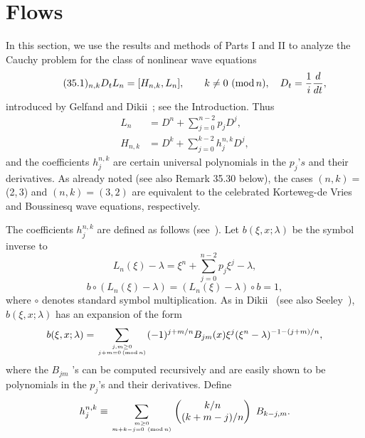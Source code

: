 \documentclass{surv-l}
\theoremstyle{plain}
\theoremstyle{definition}
\numberwithin{equation}{chapter}
\begin{document}
\section{Flows}\label{sec35}
In this section, we use the results and methods of Parts I and II to analyze the Cauchy problem for the class of nonlinear wave equations
\begin{equation*}
\tag*{$(35.1)_{n,k}$} D_{t}L_{n}=[H_{n,k}, L_{n}],\qquad k\neq 0\ (\mathrm{mod}\, n),\quad D_{t}=\displaystyle \frac{1}{i}\frac{d}{dt},
\end{equation*}
introduced by Gelfand and Dikii~\cite{GD}; see the Introduction. Thus
\begin{align*}
L_{n}&=D^{n}+\sum_{j=0}^{n-2}p_{j}D^{j},\\
H_{n,k}&=D^{k}+\sum_{j=0}^{k-2}h_{j}^{n,k}D^{j},
\end{align*}
and the coefficients $h_{j}^{n,k}$ are certain universal polynomials in the $p_{j}$'$s$ and their derivatives. As already noted (see also Remark 35.30 below), the cases $(n, k)=$ (2,\,3) and $(n,k)=(3, 2)$ are equivalent to the celebrated Korteweg-de Vries and Boussinesq wave equations, respectively.

The coefficients $h_{j}^{n,k}$ are defined as follows (see~\cite{GD}). Let $b(\xi, x; \lambda)$ be the symbol inverse to
\begin{equation*}
L_{n}(\xi)-\lambda=\xi^{n}+\sum_{j=0}^{n-2}p_{j}\xi^{j}-\lambda,
\end{equation*}
\begin{equation*}
b\circ(L_{n}(\xi)-\lambda)=(L_{n}(\xi)-\lambda)\circ b=1,
\end{equation*}
where $\circ$ denotes standard symbol multiplication. As in Dikii~\cite{Di} (see also Seeley~\cite{Se}), $b(\xi, x;\lambda)$ has an expansion of the form
\begin{equation*}
b(\xi, x; \lambda)=\sum_{j,m\geq 0\atop j+m=0\,(\mathrm{mod}\,n)}(-1)^{j+m/n}B_{jm}(x)\xi^{j}(\xi^{n}-\lambda)^{-1-(j+m)/n},
\end{equation*}
where the $B_{jm}$ 's can be computed recursively and are easily shown to be polynomials in the $p_{j}$'s and their derivatives. Define
\begin{equation*}
h_{j}^{n,k}\equiv\sum_{m\geq 0\atop{m+k-j=0\ (\mathrm{mod}\,n)}}\left(\begin{array}{@{}c@{}}
k/n\\
(k+m-j)/n
\end{array}\right)\ B_{k-j,m}.
\end{equation*}
\end{document}
